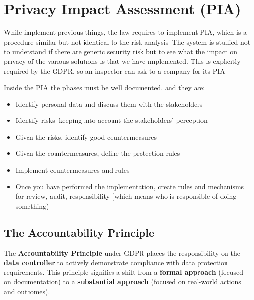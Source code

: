 \section{Privacy Impact Assessment (PIA)}
While implement previous things, the law requires to implement PIA,
which is a procedure similar but not identical to the risk analysis.
The system is studied not to understand if there are generic security
risk but to see what the impact on privacy of the various solutions is
that we have implemented. This is explicitly required by the GDPR, so
an inspector can ask to a company for its PIA.

Inside the PIA the phases must be well documented, and they are:
\begin{itemize}
  \item Identify personal data and discuss them with the stakeholders
  \item Identify risks, keeping into account the stakeholders'
    perception
  \item Given the risks, identify good countermeasures
  \item Given the countermeasures, define the protection rules
  \item Implement countermeasures and rules
  \item Once you have performed the implementation, create rules and
    mechanisms for review, audit, responsibility (which means who is
    responsible of doing something)
\end{itemize}

\subsection{The Accountability Principle}

The \textbf{Accountability Principle} under GDPR places the
responsibility on the \textbf{data controller} to actively demonstrate
compliance with data protection requirements. This principle signifies
a shift from a \textbf{formal approach} (focused on documentation) to
a \textbf{substantial approach} (focused on real-world actions and
outcomes).

